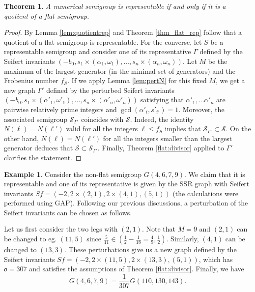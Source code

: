\documentclass[oneside]{amsart}
\numberwithin{equation}{section}
\numberwithin{equation}{subsection}
\theoremstyle{plain}
\newtheorem{theorem}[equation]{Theorem}
\theoremstyle{definition}
\newtheorem{example}[equation]{Example}
\newcommand{\calS}{{\mathcal S}}\newcommand{\cals}{{\bf s}}\newcommand{\calst}{{\bf st}}\newcommand{\cS}{{\mathcal S}}
\newcommand{\w}{\omega}
\newcommand{\al}{\alpha}
\newcommand{\oo}{\mathfrak{o}}
\begin{document}
 \begin{theorem}\label{charthm}
A numerical semigroup is representable if and only if it is a quotient of a flat semigroup.  
 \end{theorem}
 
 \begin{proof}
By  Lemma \ref{lem:quotientrep} and Theorem \ref{thm_flat_rep} follow that a quotient of a flat semigroup is representable. 
For the converse, let $S$ be a representable semigroup and consider one of its representative $\Gamma$ defined by the Seifert invariants $(-b_0,s_1\times(\al_1,\w_1),\dots,s_{n}\times(\al_{n},\w_{n}))$. Let $M$ be the maximum of the largest generator (in the minimal set of generators) and the Frobenius number $f_\calS$. If we apply Lemma \ref{lem:pertN} for this fixed $M$, we get a new graph $\Gamma'$ defined by the perturbed Seifert invariants $(-b_0,s_1\times(\al'_1,\w'_1),\dots,s_{n}\times(\al'_{n},\w'_{n}))$ satisfying that  $\al'_1,\dots\al'_n$ are pairwise relatively prime integers and $\gcd(\al'_i,s'_{i'})=1$. Moreover, the associated semigroup $\calS_{\Gamma'}$ coincides with $\calS$. Indeed, the identity $N(\ell)=N(\ell')$ valid for all the integers $\ell\leq f_S$ implies that  $\calS_{\Gamma'}\subset \calS$. On the other hand, $N(\ell)=N(\ell')$ for all the integers smaller than the largest generator deduces  that $\calS\subset \calS_{\Gamma'}$. Finally, Theorem \ref{flat:divisor} applied to $\Gamma'$ clarifies the statement.
 \end{proof}

\begin{example} 
Consider the non-flat semigroup $G(4,6,7,9)$. We claim that it is representable and one of its representative is given by the SSR graph with Seifert invariants $Sf=(-2, 2\times (2,1), 2\times (4,1), (5,1))$ (the calculations were performed using GAP\cite{GAP4}). Following our previous discussions, a perturbation of the Seifert invariants can be chosen as follows.

Let us first consider the two legs with $(2,1)$. 
Note that  $M=9$ and $(2,1)$ can be changed to eg. $(11,5)$ since $\frac{5}{11}\in (\frac{1}{2}-\frac{1}{18}=\frac{4}{9},\frac{1}{2})$. Similarly,  $(4,1)$ can be changed to $(13,3)$. These perturbations give us a new graph defined by the  Seifert invariants $Sf=(-2, 2\times (11,5), 2\times (13,3), (5,1))$, which has $\oo=307$ and satisfies the assumptions of Theorem \ref{flat:divisor}. Finally, we have
$$G(4,6,7,9)=\frac{1}{307}G(110,130,143).$$
\end{example}
    
\end{document}
